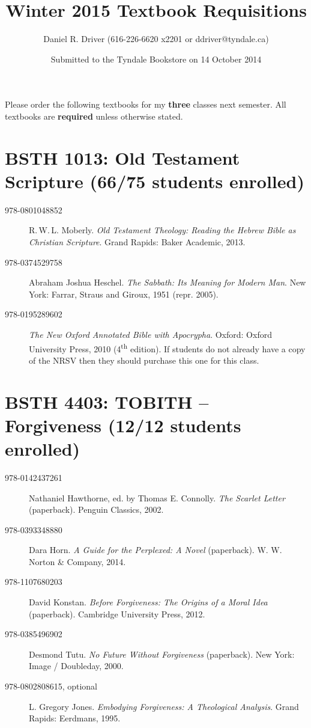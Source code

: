 \documentclass[11pt]{article}
\title{Winter 2015 Textbook Requisitions}
\author{Daniel R. Driver (616-226-6620 x2201 or ddriver@tyndale.ca)}
\date{Submitted to the Tyndale Bookstore on 14 October 2014}
\begin{document}
\maketitle

Please order the following textbooks for my \textbf{three} classes next semester. All
textbooks are \textbf{required} unless otherwise stated.

\section{BSTH 1013: Old Testament Scripture (66/75 students enrolled)}

\begin{description}

	\item[978-0801048852] R.\,W.\,L. Moberly.
    \emph{Old Testament Theology: Reading the Hebrew Bible as Christian Scripture}.
    Grand Rapids: Baker Academic, 2013.

	\item[978-0374529758] Abraham Joshua Heschel.
    \emph{The Sabbath: Its Meaning for Modern Man}.
    New York: Farrar, Straus and Giroux, 1951 (repr. 2005).

	\item[978-0195289602] \emph{The New Oxford Annotated Bible with Apocrypha}.
    Oxford: Oxford University Press, 2010 (4\textsuperscript{th} edition).
    If students do not already have a copy of the NRSV then they should purchase this one for this class.

\end{description}

\section{BSTH 4403: TOBITH -- Forgiveness (12/12 students enrolled)}

\begin{description}

	\item[978-0142437261]  Nathaniel Hawthorne, ed. by Thomas E. Connolly.
	\emph{The Scarlet Letter} (paperback).
	Penguin Classics, 2002.

	\item[978-0393348880] Dara Horn.
    \emph{A Guide for the Perplexed: A Novel} (paperback).
    W. W. Norton \& Company, 2014.

	\item[978-1107680203] David Konstan.
	\emph{Before Forgiveness: The Origins of a Moral Idea} (paperback).
	Cambridge University Press, 2012.

    \item[978-0385496902] Desmond Tutu.
    \emph{No Future Without Forgiveness} (paperback).
    New York: Image / Doubleday, 2000.

    \item[978-0802808615, optional] L. Gregory Jones.
    \emph{Embodying Forgiveness: A Theological Analysis}.
    Grand Rapids: Eerdmans, 1995.

\end{description}
\end{document}

